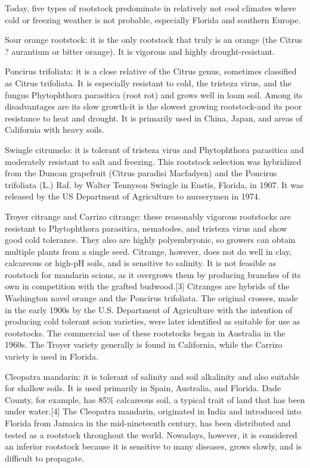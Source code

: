 \documentclass[
  openany]{book}
\begin{document}
Today, five types of rootstock predominate in relatively not cool climates where cold or freezing weather is not probable, especially Florida and southern Europe.

Sour orange rootstock: it is the only rootstock that truly is an orange (the Citrus ? aurantium or bitter orange). It is vigorous and highly drought-resistant.

Poncirus trifoliata: it is a close relative of the Citrus genus, sometimes classified as Citrus trifoliata. It is especially resistant to cold, the tristeza virus, and the fungus Phytophthora parasitica (root rot) and grows well in loam soil. Among its disadvantages are its slow growth-it is the slowest growing rootstock-and its poor resistance to heat and drought. It is primarily used in China, Japan, and areas of California with heavy soils.

Swingle citrumelo: it is tolerant of tristeza virus and Phytophthora parasitica and moderately resistant to salt and freezing. This rootstock selection was hybridized from the Duncan grapefruit (Citrus paradisi Macfadyen) and the Poncirus trifoliata (L.) Raf. by Walter Tennyson Swingle in Eustis, Florida, in 1907. It was released by the US Department of Agriculture to nurserymen in 1974.

Troyer citrange and Carrizo citrange: these reasonably vigorous rootstocks are resistant to Phytophthora parasitica, nematodes, and tristeza virus and show good cold tolerance. They also are highly polyembryonic, so growers can obtain multiple plants from a single seed. Citrange, however, does not do well in clay, calcareous or high-pH soils, and is sensitive to salinity. It is not feasible as rootstock for mandarin scions, as it overgrows them by producing branches of its own in competition with the grafted budwood.{[}3{]} Citranges are hybrids of the Washington navel orange and the Poncirus trifoliata. The original crosses, made in the early 1900s by the U.S. Department of Agriculture with the intention of producing cold tolerant scion varieties, were later identified as suitable for use as rootstocks. The commercial use of these rootstocks began in Australia in the 1960s. The Troyer variety generally is found in California, while the Carrizo variety is used in Florida.

Cleopatra mandarin: it is tolerant of salinity and soil alkalinity and also suitable for shallow soils. It is used primarily in Spain, Australia, and Florida. Dade County, for example, has 85\% calcareous soil, a typical trait of land that has been under water.{[}4{]} The Cleopatra mandarin, originated in India and introduced into Florida from Jamaica in the mid-nineteenth century, has been distributed and tested as a rootstock throughout the world. Nowadays, however, it is considered an inferior rootstock because it is sensitive to many diseases, grows slowly, and is difficult to propagate.
\end{document}
